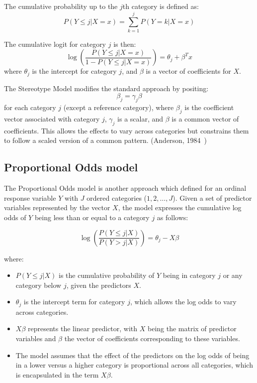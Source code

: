 \documentclass{article}
\begin{document}
The cumulative probability up to the $j$th category is defined as:
\[
P(Y \leq j | X = x) = \sum_{k=1}^{j} P(Y = k | X = x)
\]

The cumulative logit for category $j$ is then:
\[
\log\left(\frac{P(Y \leq j | X = x)}{1 - P(Y \leq j | X = x)}\right) = \theta_j + \beta^T x
\]
where $\theta_j$ is the intercept for category $j$, and $\beta$ is a vector of coefficients for $X$.

The Stereotype Model modifies the standard approach by positing:
\[
\beta_j = \gamma_j \beta
\]
for each category $j$ (except a reference category), where $\beta_j$ is the coefficient vector associated with category $j$, $\gamma_j$ is a scalar, 
and $\beta$ is a common vector of coefficients. This allows the effects to vary across categories but constrains them to follow a scaled version of a common pattern. (Anderson, 1984~\cite{anderson1984regression})

\subsection{Proportional Odds model}

The Proportional Odds model is another approach which defined for an ordinal response variable $Y$ with $J$ ordered categories ($1, 2, \ldots, J$). 
Given a set of predictor variables represented by the vector $X$, the model expresses the cumulative log odds of $Y$ being less than or equal to a category $j$ as follows:

\[
\log\left(\frac{P(Y \leq j | X)}{P(Y > j | X)}\right) = \theta_j - X\beta
\]

where:
\begin{itemize}
    \item $P(Y \leq j | X)$ is the cumulative probability of $Y$ being in category $j$ or any category below $j$, given the predictors $X$.
    \item $\theta_j$ is the intercept term for category $j$, which allows the log odds to vary across categories.
    \item $X\beta$ represents the linear predictor, with $X$ being the matrix of predictor variables and $\beta$ the vector of coefficients corresponding to these variables.
    \item The model assumes that the effect of the predictors on the log odds of being in a lower versus a higher category is proportional across all categories, which is encapsulated in the term $X\beta$.
\end{itemize}
\end{document}
